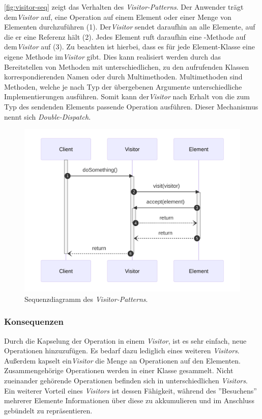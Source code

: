 \autoref{fig:visitor-seq} zeigt das Verhalten des \emph{Visitor-Patterns}. Der Anwender trägt dem\emph{Visitor} auf, eine Operation auf einem Element oder einer Menge von Elementen durchzuführen (1). Der\emph{Visitor} sendet daraufhin  an alle Elemente, auf die er eine Referenz hält (2). Jedes Element ruft daraufhin eine -Methode auf dem\emph{Visitor} auf (3). Zu beachten ist hierbei, dass es für jede Element-Klasse eine eigene Methode im\emph{Visitor} gibt. Dies kann realisiert werden durch das Bereitstellen von Methoden mit unterschiedlichen, zu den aufrufenden Klassen korrespondierenden Namen oder durch Multimethoden. Multimethoden sind Methoden, welche je nach Typ der übergebenen Argumente unterschiedliche Implementierungen ausführen. Somit kann der\emph{Visitor} nach Erhalt von  die zum Typ des sendenden Elements passende Operation ausführen. Dieser Mechanismus nennt sich \emph{Double-Dispatch}.

\begin{figure}[!ht]
	\centering
	\includegraphics[width=0.75\linewidth]{images/patterns/visitor-seq.png}
	\caption{Sequenzdiagramm des \emph{Visitor-Patterns}. \cite{skobeleva_visitor_2023}}
	\label{fig:visitor-seq}
\end{figure}

\subsubsection*{Konsequenzen}
Durch die Kapselung der Operation in einem \emph{Visitor}, ist es sehr einfach, neue Operationen hinzuzufügen. Es bedarf dazu lediglich eines weiteren \emph{Visitors}. Außerdem kapselt ein\emph{Visitor} die Menge an Operationen auf den Elementen. Zusammengehörige Operationen werden in einer Klasse gesammelt. Nicht zueinander gehörende Operationen befinden sich in unterschiedlichen \emph{Visitors}. Ein weiterer Vorteil eines \emph{Visitors} ist dessen Fähigkeit, während des ''Besuchens'' mehrerer Elemente Informationen über diese zu akkumulieren und im Anschluss gebündelt zu repräsentieren.


